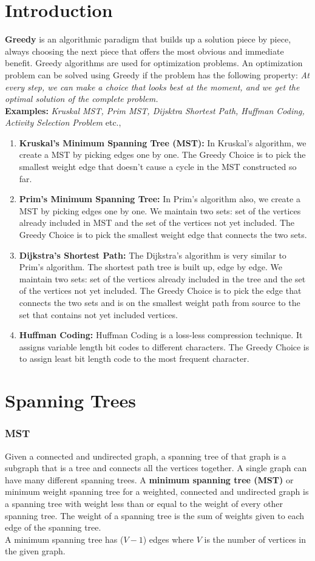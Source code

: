 \documentclass[a4paper,oneside]{book}
\begin{document}
\section{Introduction}
\textbf{Greedy} is an algorithmic paradigm that builds up a solution piece by piece, always choosing the next piece that offers the most obvious and immediate benefit. Greedy algorithms are used for optimization problems. An optimization problem can be solved using Greedy if the problem has the following property: \textit{At every step, we can make a choice that looks best at the moment, and we get the optimal solution of the complete problem.}\\
\textbf{Examples:} \textit{Kruskal MST, Prim MST, Dijsktra Shortest Path, Huffman Coding, Activity Selection Problem} etc.,
\begin{enumerate}
\item \textbf{Kruskal's Minimum Spanning Tree (MST):} In Kruskal's algorithm, we create a MST by picking edges one by one. The Greedy Choice is to pick the smallest weight edge that doesn't cause a cycle in the MST constructed so far.
\item \textbf{Prim's Minimum Spanning Tree:} In Prim's algorithm also, we create a MST by picking edges one by one. We maintain two sets: set of the vertices already included in MST and the set of the vertices not yet included. The Greedy Choice is to pick the smallest weight edge that connects the two sets.
\item \textbf{Dijkstra's Shortest Path:} The Dijkstra's algorithm is very similar to Prim's algorithm. The shortest path tree is built up, edge by edge. We maintain two sets: set of the vertices already included in the tree and the set of the vertices not yet included. The Greedy Choice is to pick the edge that connects the two sets and is on the smallest weight path from source to the set that contains not yet included vertices.
\item \textbf{Huffman Coding:} Huffman Coding is a loss-less compression technique. It assigns variable length bit codes to different characters. The Greedy Choice is to assign least bit length code to the most frequent character.
\end{enumerate}
\section{Spanning Trees}
\subsubsection{MST}
Given a connected and undirected graph, a spanning tree of that graph is a subgraph that is a tree and connects all the vertices together. A single graph can have many different spanning trees. A \textbf{minimum spanning tree (MST)} or minimum weight spanning tree for a weighted, connected and undirected graph is a spanning tree with weight less than or equal to the weight of every other spanning tree. The weight of a spanning tree is the sum of weights given to each edge of the spanning tree. \\
A minimum spanning tree has ($V - 1$) edges where $V$ is the number of vertices in the given graph.
\end{document}
